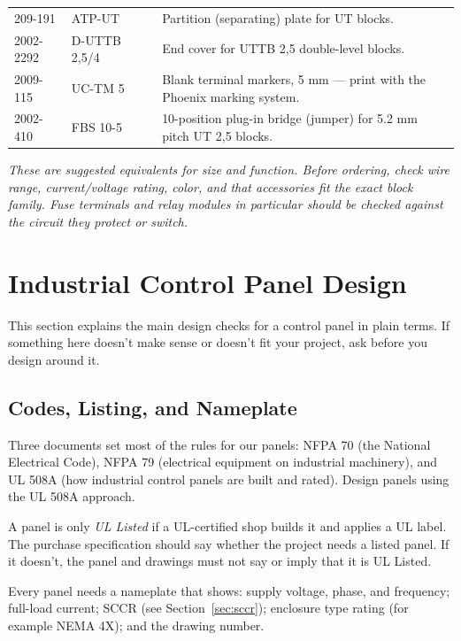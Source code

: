 \begin{small}
\begin{longtable}{@{}P{3.0cm}P{3.4cm}P{1.9cm}P{7.3cm}@{}}
209-191 & ATP-UT &  & Partition (separating) plate for UT blocks. \\
2002-2292 & D-UTTB 2,5/4 &  & End cover for UTTB 2,5 double-level blocks. \\
2009-115 & UC-TM 5 &  & Blank terminal markers, 5 mm --- print with the Phoenix marking system. \\
2002-410 & FBS 10-5 &  & 10-position plug-in bridge (jumper) for 5.2 mm pitch UT 2,5 blocks. \\
\bottomrule
\end{longtable}
\end{small}
\textit{\small These are suggested equivalents for size and function. Before ordering, check wire range, current/voltage rating, color, and that accessories fit the exact block family. Fuse terminals and relay modules in particular should be checked against the circuit they protect or switch.}

\section{Industrial Control Panel Design}
This section explains the main design checks for a control panel in plain terms. If something here doesn't make sense or doesn't fit your project, ask before you design around it.

\subsection{Codes, Listing, and Nameplate}
Three documents set most of the rules for our panels: NFPA 70 (the National Electrical Code), NFPA 79 (electrical equipment on industrial machinery), and UL 508A (how industrial control panels are built and rated). Design panels using the UL 508A approach.


A panel is only \emph{UL Listed} if a UL-certified shop builds it and applies a UL label. The purchase specification should say whether the project needs a listed panel. If it doesn't, the panel and drawings must not say or imply that it is UL Listed.

Every panel needs a nameplate that shows: supply voltage, phase, and frequency; full-load current; SCCR (see Section~\ref{sec:sccr}); enclosure type rating (for example NEMA 4X); and the drawing number.

